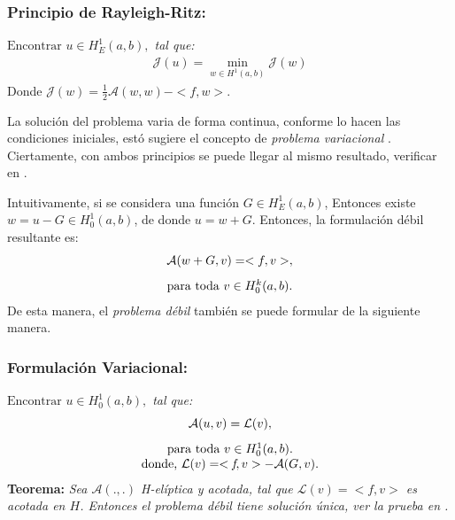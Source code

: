 \documentclass[12pt]{article}
\begin{document}
\subsubsection{\bf Principio de Rayleigh-Ritz:} {\em 
	$\textrm{Encontrar }u\in H^1_E(a,b),$\textrm{ tal que: }
	\begin{equation*}
	\begin{array}{c}
	\mathcal{J}(u)= \min\limits_{w \in H^1(a,b)}\mathcal{J}(w)
	\label{Ecu:13}
	\end{array}
	\end{equation*} }
Donde $\mathcal{J}(w)=\frac{1}{2}\mathcal{A}(w,w)-<f,w>$.

La solución del problema varia de forma continua, conforme lo hacen las condiciones iniciales, estó sugiere el concepto de \textit{problema variacional} \cite{Art01}. Ciertamente, con ambos principios se puede llegar al mismo resultado, verificar en \cite{Lib04}. 

Intuitivamente, si se considera una función $\textit{G} \in H^1_E(a,b)$, Entonces existe $\textit{w} = \textit{u}-\textit{G} \in H^1_0(a,b)$, de donde $\textit{u} = \textit{w}+\textit{G}$. Entonces, la formulación débil resultante es: 
\begin{equation*}
\begin{array}{c}
\mathcal{A}(w+G,v)=<f,v>,\\[0.3cm]
$para toda $ v \in H^k_0(a,b).
\label{Ecu:14}
\end{array}
\end{equation*} 
De esta manera, el \textit{problema débil} también se puede formular de la siguiente manera.
\subsubsection{\bf Formulación Variacional:} {\em 
$\textrm{Encontrar }\textit{u} \in H^1_0(a,b),$\textrm{ tal que:}
\begin{equation*}
	\begin{array}{c}
	\mathcal{A}(u,v)=\mathcal{L}(v),\\[0.3cm]
	$para toda $ v \in H^1_0(a,b).\\
	$donde, $ \mathcal{L}(v) = <\textit{f},v>-\mathcal{A}(G,v).
	\label{Ecu:17}
	\end{array}
\end{equation*} }
{\bf Teorema:} {\em Sea $\mathcal{A}(.,.)$ \textit{H}-elíptica y acotada, tal que $\mathcal{L}(v) = <\textit{f},v>$ es acotada en $H$. Entonces el problema débil tiene solución única, ver la prueba en \cite{Lib08}.}
\end{document}
